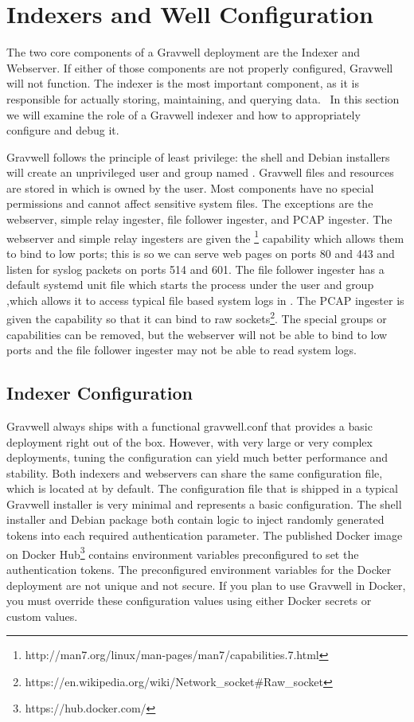 \chapter{Indexers and Well Configuration}
The two core components of a Gravwell deployment are the Indexer and
Webserver. If either of those components are not properly configured,
Gravwell will not function. The indexer is the most important
component, as it is responsible for actually storing, maintaining, and
querying data. ~In this section we will examine the role of a Gravwell
indexer and how to appropriately configure and debug it.

Gravwell follows the principle of least privilege: the shell and Debian
installers will create an unprivileged user and group named
. Gravwell files and resources are stored in
 which is owned by the  user. Most
components have no special permissions and cannot affect sensitive
system files. The exceptions are the webserver, simple relay ingester,
file follower ingester, and PCAP ingester. The webserver and simple relay ingesters are given the
\footnote{http://man7.org/linux/man-pages/man7/capabilities.7.html} capability which allows them to bind to low ports; this is so we can serve web pages
on ports 80 and 443 and listen for syslog packets on ports 514 and 601. The file follower ingester has a default systemd
unit file which starts the process under the user  and group
,which allows it to access typical file based system logs in
. The PCAP ingester is given the
 capability so that it can bind to raw
sockets\footnote{https://en.wikipedia.org/wiki/Network\_socket\#Raw\_socket}. The
special groups or capabilities can be removed, but the webserver will
not be able to bind to low ports and the file follower ingester may not
be able to read system logs.


\section{Indexer Configuration}
Gravwell always ships with a functional gravwell.conf that provides a
basic deployment right out of the box. However, with very large or very
complex deployments, tuning the configuration can yield much better
performance and stability. Both indexers and webservers can share the
same configuration file, which is located at
 by default. The configuration file
that is shipped in a typical Gravwell installer is very minimal and
represents a basic configuration. The shell installer and Debian
package both contain logic to inject randomly generated tokens into each
required authentication parameter. The published Docker image on Docker
Hub\footnote{https://hub.docker.com/} contains
environment variables preconfigured to set the authentication tokens.
The preconfigured environment variables for the Docker deployment are
not unique and not secure. If you plan to use Gravwell in Docker, you
must override these configuration values using either Docker secrets or
custom values.

